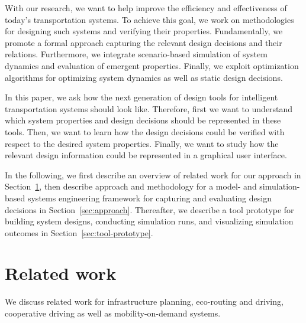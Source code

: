 \documentclass[a4paper,twoside]{article}
\begin{document}
	
	With our research, we want to help improve the efficiency and effectiveness of today's transportation systems.
	To achieve this goal, we work on methodologies for designing such systems and verifying their properties.
	Fundamentally, we promote a formal approach capturing the relevant design decisions and their relations.
	Furthermore, we integrate scenario-based simulation of system dynamics and evaluation of emergent properties.
	Finally, we exploit optimization algorithms for optimizing system dynamics as well as static design decisions.
	
	
	In this paper, we ask how the next generation of design tools for intelligent transportation systems should look like.
	Therefore, first we want to understand which system properties and design decisions should be represented in these tools.
	Then, we want to learn how the design decisions could be verified with respect to the desired system properties.
	Finally, we want to study how the relevant design information could be represented in a graphical user interface.
	
	
	In the following, we first describe an overview of related work for our approach in Section~\ref{sec:related-work}, then describe approach and methodology for a model- and simulation-based systems engineering framework for capturing and evaluating design decisions in Section~\ref{sec:approach}.
	Thereafter, we describe a tool prototype for building system designs, conducting simulation runs, and visualizing simulation outcomes in Section~\ref{sec:tool-prototype}.
	
	\section{Related work}
	\label{sec:related-work}
	We discuss related work for infrastructure planning, eco-routing and driving, cooperative driving as well as mobility-on-demand systems.
\end{document}
